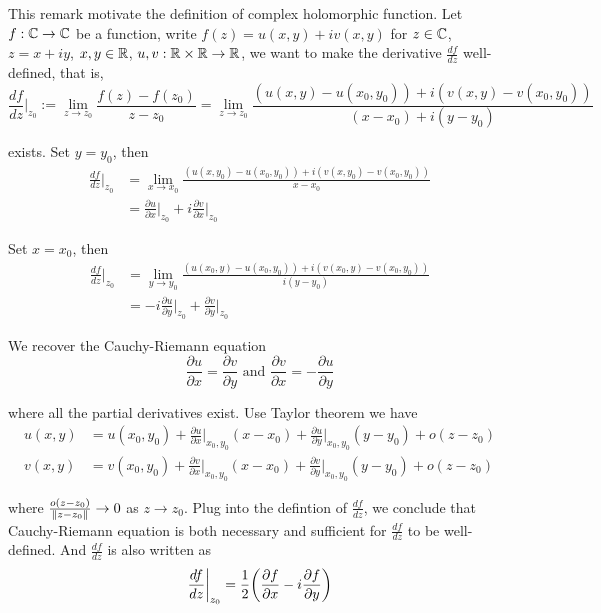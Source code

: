 \begin{remark}
	This remark motivate the definition of complex holomorphic function. Let $f: \mathbb{C} \to \mathbb{C}$ be a function, write $f(z) = u(x, y) + i v(x, y)$ for $z \in \mathbb{C}$, $z = x + iy$, $x, y \in \mathbb{R}$, $u, v: \mathbb{R} \times \mathbb{R} \to \mathbb{R}$, we want to make the derivative $\frac{df}{dz}$ well-defined, that is, 
	$$
	\frac{df}{dz}\bigg\vert_{z_0} := \lim_{z \to z_0} \frac{f(z) - f(z_0)}{z - z_0} = \lim_{z \to z_0} \frac{(u(x, y) - u(x_0, y_0)) + i (v(x, y)  - v(x_0, y_0))}{(x - x_0) + i (y - y_0)}
	$$
	
	exists. Set $y = y_0$, then 
	\begin{align*}
		\frac{df}{dz}\bigg\vert_{z_0}
		&= \lim_{x \to x_0} \frac{(u(x, y_0) - u(x_0, y_0)) + i (v(x, y_0)  - v(x_0, y_0))}{x - x_0} \\
		&= \frac{\partial u}{\partial x}\bigg\vert_{z_0} + i \frac{\partial v}{ \partial x}\bigg\vert_{z_0}
	\end{align*}
	
	Set $x = x_0$, then
	\begin{align*}
		\frac{df}{dz}\bigg\vert_{z_0}
		&= \lim_{y \to y_0} \frac{(u(x_0, y) - u(x_0, y_0)) + i (v(x_0, y)  - v(x_0, y_0))}{i (y - y_0)} \\
		&= -i \frac{\partial u}{\partial y}\bigg\vert_{z_0} + \frac{\partial v}{\partial y}\bigg\vert_{z_0}
	\end{align*}
	
	We recover the Cauchy-Riemann equation
	$$
	\frac{\partial u}{\partial x} = \frac{\partial v}{\partial y} \text{ and } \frac{\partial v}{\partial x} = - \frac{\partial u}{\partial y}
	$$
	
	where all the partial derivatives exist. Use Taylor theorem we have
	\begin{align*}
		u(x, y) &= u(x_0, y_0) + \frac{\partial u}{\partial x}\bigg\vert_{x_0,y_0} (x - x_0) + \frac{\partial u}{\partial y}\bigg\vert_{x_0,y_0} (y - y_0) + o(z - z_0) \\
		v(x, y) &= v(x_0, y_0) + \frac{\partial v}{\partial x}\bigg\vert_{x_0,y_0} (x - x_0) + \frac{\partial v}{\partial y}\bigg\vert_{x_0,y_0} (y - y_0) + o(z - z_0)
	\end{align*}
	
	where $\frac{o(z - z_0)}{\lVert z - z_0\rVert} \to 0$ as $z \to z_0$. Plug into the defintion of $\frac{df}{dz}$, we conclude that Cauchy-Riemann equation is both necessary and sufficient for $\frac{df}{dz}$ to be well-defined. And $\frac{df}{dz}$ is also written as
	$$
	\frac{df}{dz}\bigg\vert_{z_0} = \frac{1}{2} \tuple*{\frac{\partial f}{\partial x} - i \frac{\partial f}{\partial y}}
	$$
\end{remark}

